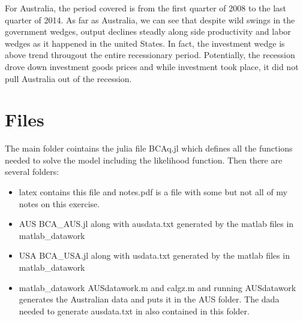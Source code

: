 \documentclass{article} %
\begin{document}
%
For Australia, the period covered is from the first quarter of 2008 to the last quarter of 2014. As far as Australia, we can see that despite wild swings in the government wedges, output declines steadly along side productivity and labor wedges as it happened in the united States. In fact, the investment wedge is above trend througout the entire recessionary period. Potentially, the recession drove down investment goods prices and while investment took place, it did not pull Australia out of the recession.  

\section*{Files}
The main folder cointains the julia file BCAq.jl which defines all the functions needed to solve the model including the likelihood function. Then there are several folders:
\begin{itemize}
\item latex
  contains this file and notes.pdf is a file with some but not all of my notes on this exercise. 
\item AUS
  BCA\_AUS.jl along with ausdata.txt generated by the matlab files in matlab\_datawork
\item USA
  BCA\_USA.jl along with usdata.txt generated by the matlab files in matlab\_datawork
\item matlab\_datawork
  AUSdatawork.m and calgz.m and running AUSdatawork generates the Australian data and puts it in the AUS folder. The dada needed to generate ausdata.txt in also contained in this folder.  
  \end{itemize}

%
%
\end{document}
